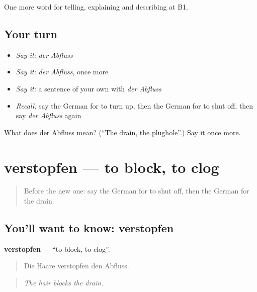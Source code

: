 \begin{grammarlens}[title={What you've built}]
One more word for telling, explaining and describing at B1.
\end{grammarlens}

\subsection*{Your turn}
\begin{itemize}
\raggedright
  \item \emph{Say it:} \emph{der Abfluss}
  \item \emph{Say it:} \emph{der Abfluss}, once more
  \item \emph{Say it:} a sentence of your own with \emph{der Abfluss}
  \item \emph{Recall:} say the German for to turn up, then the German for to shut off, then say \emph{der Abfluss} again
\end{itemize}

\begin{tcolorbox}[breakable,colback=teal!4,colframe=teal!35!black,title={Before you move on}]
What does der Abfluss mean? (\textquotedblleft{}The drain, the plughole\textquotedblright{}.) Say it once more.
\end{tcolorbox}
\section[verstopfen]{verstopfen — to block, to clog}

\label{lesson:GE-C428-verstopfen}



\begin{quote}
Before the new one: say the German for to shut off, then the German for the drain.
\end{quote}

\subsection*{You'll want to know: verstopfen}
\textbf{verstopfen} — \textquotedblleft{}to block, to clog\textquotedblright{}.

\begin{quote}
Die Haare verstopfen den Abfluss.
\end{quote}

\begin{quote}
\emph{The hair blocks the drain.}
\end{quote}

